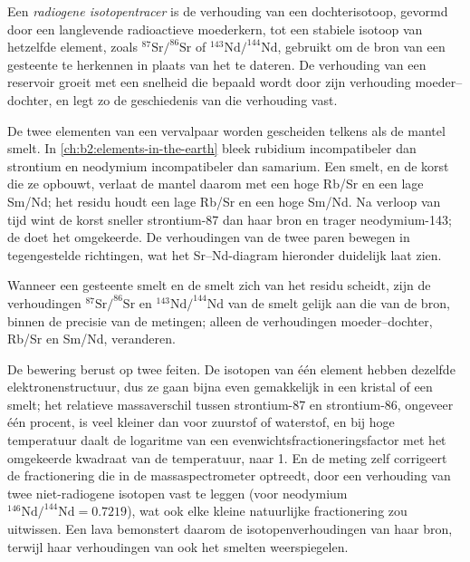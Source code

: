 \begin{definition}\label{def:b2:isotope-geochemistry:tracer}
Een \emph{radiogene isotopentracer} is de verhouding
van een dochterisotoop, gevormd door een langlevende radioactieve moederkern, tot een stabiele
isotoop van hetzelfde element, zoals $^{87}\mathrm{Sr}/^{86}\mathrm{Sr}$ of
$^{143}\mathrm{Nd}/^{144}\mathrm{Nd}$, gebruikt om de bron van een gesteente te herkennen in plaats
van het te dateren. De verhouding van een reservoir groeit met een snelheid die bepaald wordt door zijn
verhouding moeder--dochter, en legt zo de geschiedenis van die verhouding vast.
\end{definition}

De twee elementen van een vervalpaar worden gescheiden telkens als de mantel smelt. In
\cref{ch:b2:elements-in-the-earth} bleek rubidium incompatibeler dan
strontium en neodymium incompatibeler dan samarium. Een smelt, en de korst
die ze opbouwt, verlaat de mantel daarom met een hoge Rb/Sr en een lage Sm/Nd; het
residu houdt een lage Rb/Sr en een hoge Sm/Nd. Na verloop van tijd wint de korst
sneller strontium-87 dan haar bron en trager neodymium-143; de  doet het omgekeerde. De verhoudingen van de twee paren bewegen in tegengestelde
richtingen, wat het Sr--Nd-diagram hieronder duidelijk laat zien.

\begin{proposition}\label{prop:b2:isotope-geochemistry:melting}
Wanneer een gesteente smelt en de smelt zich van het residu scheidt, zijn de verhoudingen
$^{87}\mathrm{Sr}/^{86}\mathrm{Sr}$ en $^{143}\mathrm{Nd}/^{144}\mathrm{Nd}$ van
de smelt gelijk aan die van de bron, binnen de precisie van de
metingen; alleen de verhoudingen moeder--dochter, Rb/Sr en Sm/Nd, veranderen.
\end{proposition}
\admitted

\noindent De bewering berust op twee feiten. De isotopen van één element hebben
dezelfde elektronenstructuur, dus ze gaan bijna even gemakkelijk in een kristal of een smelt; het
relatieve massaverschil tussen strontium-87 en strontium-86, ongeveer één
procent, is veel kleiner dan voor zuurstof of waterstof, en bij hoge temperatuur daalt de
logaritme van een evenwichtsfractioneringsfactor met het omgekeerde kwadraat van
de temperatuur, naar 1. En de meting zelf corrigeert de
fractionering die in de massaspectrometer optreedt, door een verhouding van twee
niet-radiogene isotopen vast te leggen (voor neodymium $^{146}\mathrm{Nd}/^{144}\mathrm{Nd} =
0.7219$), wat ook elke kleine natuurlijke fractionering zou uitwissen. Een lava
bemonstert daarom de isotopenverhoudingen van haar bron, terwijl haar verhoudingen van
 ook het smelten weerspiegelen.

